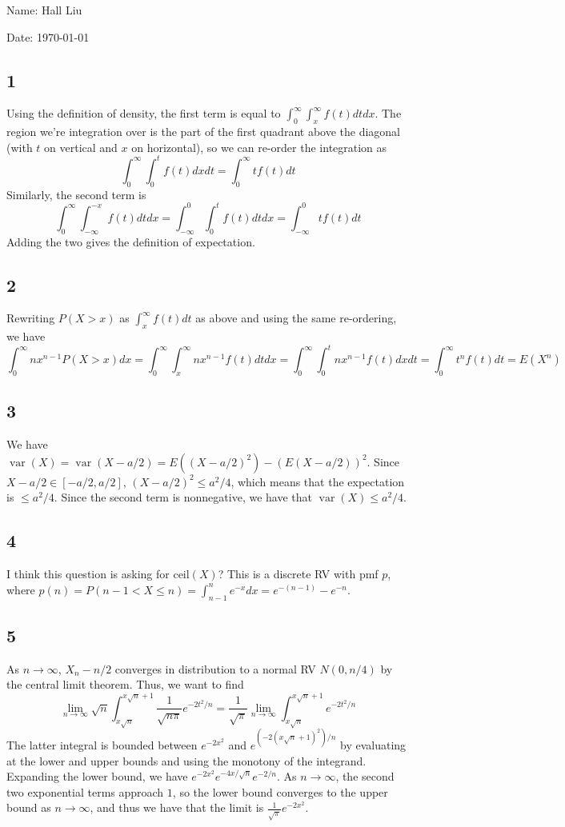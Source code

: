 \documentclass{article}
\DeclareMathOperator{\var}{var}
\begin{document}
Name: Hall Liu

Date: \today 
\vspace{1.5cm}

\subsection*{1}
Using the definition of density, the first term is equal to $\int_0^\infty\int_x^\infty f(t)dtdx$. The region we're integration over is the part of the first quadrant above the diagonal (with $t$ on vertical and $x$ on horizontal), so we can re-order the integration as
$$\int_0^\infty\int_0^tf(t)dxdt=\int_0^\infty tf(t)dt$$
Similarly, the second term is 
$$\int_0^\infty\int_{-\infty}^{-x}f(t)dtdx=\int_{-\infty}^0\int_0^tf(t)dtdx=\int_{-\infty}^0tf(t)dt$$
Adding the two gives the definition of expectation.
\subsection*{2}
Rewriting $P(X>x)$ as $\int_x^\infty f(t)dt$ as above and using the same re-ordering, we have
$$\int_0^\infty nx^{n-1}P(X>x)dx=\int_0^\infty\int_x^\infty nx^{n-1}f(t)dtdx=\int_0^\infty\int_0^tnx^{n-1}f(t)dxdt=\int_0^\infty t^nf(t)dt=E(X^n)$$
\subsection*{3}
We have $\var(X)=\var(X-a/2)=E((X-a/2)^2)-(E(X-a/2))^2$. Since $X-a/2\in[-a/2,a/2]$, $(X-a/2)^2\leq a^2/4$, which means that the expectation is $\leq a^2/4$. Since the second term is nonnegative, we have that $\var(X)\leq a^2/4$.
\subsection*{4}
I think this question is asking for $\text{ceil}(X)$? This is a discrete RV with pmf $p$, where $p(n)=P(n-1<X\leq n)=\int_{n-1}^ne^{-x}dx=e^{-(n-1)}-e^{-n}$.
\subsection*{5}
As $n\to\infty$, $X_n-n/2$ converges in distribution to a normal RV $N(0,n/4)$ by the central limit theorem. Thus, we want to find 
$$\lim_{n\to\infty}\sqrt{n}\int_{x\sqrt{n}}^{x\sqrt{n}+1}\frac{1}{\sqrt{n\pi}}e^{-2t^2/n}=\frac{1}{\sqrt{\pi}}\lim_{n\to\infty}\int_{x\sqrt{n}}^{x\sqrt{n}+1}e^{-2t^2/n}$$
The latter integral is bounded between $e^{-2x^2}$ and $e^{(-2(x\sqrt{n}+1)^2)/n}$ by evaluating at the lower and upper bounds and using the monotony of the integrand. Expanding the lower bound, we have $e^{-2x^2}e^{-4x/\sqrt{n}}e^{-2/n}$. As $n\to\infty$, the second two exponential terms approach $1$, so the lower bound converges to the upper bound as $n\to\infty$, and thus we have that the limit is $\frac{1}{\sqrt{\pi}}e^{-2x^2}$.
\end{document}
